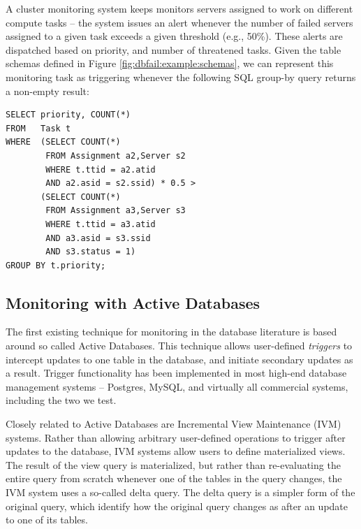 \begin{example}
\label{ex:dbfail:network}
A cluster monitoring system keeps monitors servers assigned to work on different compute tasks -- the system issues an alert whenever the number of failed servers assigned to a given task exceeds a given threshold (e.g., 50\%).  These alerts are dispatched based on priority, and number of threatened tasks.  Given the table schemas defined in Figure \ref{fig:dbfail:example:schemas}, we can represent this monitoring task as triggering whenever the following SQL group-by query returns a non-empty result:
\begin{verbatim}
SELECT priority, COUNT(*)
FROM   Task t
WHERE  (SELECT COUNT(*) 
        FROM Assignment a2,Server s2
        WHERE t.ttid = a2.atid 
        AND a2.asid = s2.ssid) * 0.5 > 
       (SELECT COUNT(*) 
        FROM Assignment a3,Server s3
        WHERE t.ttid = a3.atid 
        AND a3.asid = s3.ssid 
        AND s3.status = 1)
GROUP BY t.priority;
\end{verbatim}

\end{example}

\subsection{Monitoring with Active Databases}
The first existing technique for monitoring in the database literature is based around so called Active Databases\cite{?}.  This technique allows user-defined {\em triggers} to intercept updates to one table in the database, and initiate secondary updates as a result.  Trigger functionality has been implemented in most high-end database management systems -- Postgres\cite{?}, MySQL\cite{?}, and virtually all commercial systems, including the two we test.

Closely related to Active Databases are Incremental View Maintenance\cite{?} (IVM) systems.  Rather than allowing arbitrary user-defined operations to trigger after updates to the database, IVM systems allow users to define materialized views.  The result of the view query is materialized, but rather than re-evaluating the entire query from scratch whenever one of the tables in the query changes, the IVM system uses a so-called delta query.  The delta query is a simpler form of the original query, which identify how the original query changes as after an update to one of its tables.  

